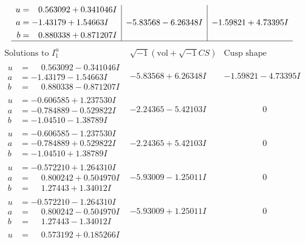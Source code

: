 \documentclass[1p]{elsarticle_modified}
\theoremstyle{definition}
\newcommand{\I}{\sqrt{-1}}
\begin{document}
$$\begin{array}{c|c|c}
\begin{aligned}
u &= \phantom{-}0.563092 + 0.341046 I \\
a &= -1.43179 + 1.54663 I \\
b &= \phantom{-}0.880338 + 0.871207 I\end{aligned}
 & -5.83568 - 6.26348 I & -1.59821 + 4.73395 I\\
 \hline 
 \end{array}$$\newpage$$\begin{array}{c|c|c}  
\text{Solutions to }I^u_{1}& \I (\text{vol} + \sqrt{-1}CS) & \text{Cusp shape}\\
 \hline 
\begin{aligned}
u &= \phantom{-}0.563092 - 0.341046 I \\
a &= -1.43179 - 1.54663 I \\
b &= \phantom{-}0.880338 - 0.871207 I\end{aligned}
 & -5.83568 + 6.26348 I & -1.59821 - 4.73395 I \\ \hline\begin{aligned}
u &= -0.606585 + 1.237530 I \\
a &= -0.784889 - 0.529822 I \\
b &= -1.04510 - 1.38789 I\end{aligned}
 & -2.24365 - 5.42103 I & \phantom{-0.000000 } 0 \\ \hline\begin{aligned}
u &= -0.606585 - 1.237530 I \\
a &= -0.784889 + 0.529822 I \\
b &= -1.04510 + 1.38789 I\end{aligned}
 & -2.24365 + 5.42103 I & \phantom{-0.000000 } 0 \\ \hline\begin{aligned}
u &= -0.572210 + 1.264310 I \\
a &= \phantom{-}0.800242 + 0.504970 I \\
b &= \phantom{-}1.27443 + 1.34012 I\end{aligned}
 & -5.93009 - 1.25011 I & \phantom{-0.000000 } 0 \\ \hline\begin{aligned}
u &= -0.572210 - 1.264310 I \\
a &= \phantom{-}0.800242 - 0.504970 I \\
b &= \phantom{-}1.27443 - 1.34012 I\end{aligned}
 & -5.93009 + 1.25011 I & \phantom{-0.000000 } 0 \\ \hline\begin{aligned}
u &= \phantom{-}0.573192 + 0.185266 I \\

\end{aligned}
\end{array}$$
\end{document}
